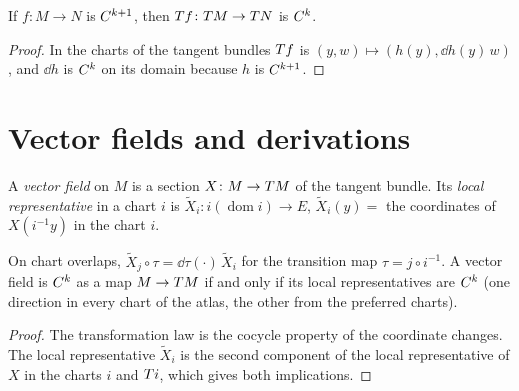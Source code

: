 \begin{theorem}
  \label{thm:man-tangent-map-smooth}
  \leanok
  If $f \colon M \to N$ is $C^{k+1}$, then $T f \colon T M \to T N$ is $C^{k}$.
\end{theorem}

\begin{proof}
  \leanok
  In the charts of the tangent bundles $T f$ is $(y, w) \mapsto (h(y), \dd h(y)\,w)$, and
  $\dd h$ is $C^{k}$ on its domain because $h$ is $C^{k+1}$.
\end{proof}

\section{Vector fields and derivations}

\begin{definition}
  \label{def:vector-field}
  \leanok
  A \emph{vector field} on $M$ is a section $X \colon M \to T M$ of the tangent bundle. Its
  \emph{local representative} in a chart $i$ is $\widetilde{X}_i \colon i(\operatorname{dom} i)
  \to E$, $\widetilde{X}_i(y) = $ the coordinates of $X(i^{-1}y)$ in the chart $i$.
\end{definition}

\begin{proposition}
  \label{prop:man-localrep}
  \leanok
  On chart overlaps, $\widetilde{X}_j \circ \tau = \dd\tau(\cdot)\,\widetilde{X}_i$ for the
  transition map $\tau = j \circ i^{-1}$. A vector field is $C^{k}$ as a map $M \to T M$ if and
  only if its local representatives are $C^{k}$ (one direction in every chart of the atlas, the
  other from the preferred charts).
\end{proposition}

\begin{proof}
  \leanok
  The transformation law is the cocycle property of the coordinate changes. The local
  representative $\widetilde{X}_i$ is the second component of the local representative of $X$ in
  the charts $i$ and $T i$, which gives both implications.
\end{proof}

